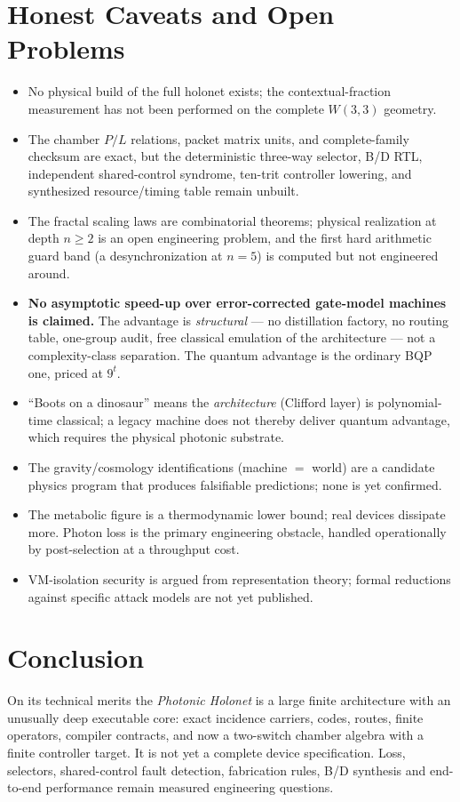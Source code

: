 \documentclass[11pt]{article}
\begin{document}
\section{Honest Caveats and Open Problems}
\label{sec:caveats}
\begin{itemize}[leftmargin=1.4em]
\item No physical build of the full holonet exists; the contextual-fraction measurement has not been
performed on the complete $W(3,3)$ geometry.
\item The chamber $P/L$ relations, packet matrix units, and complete-family checksum are exact, but
the deterministic three-way selector, B/D RTL, independent shared-control syndrome, ten-trit
controller lowering, and synthesized resource/timing table remain unbuilt.
\item The fractal scaling laws are combinatorial theorems; physical realization at depth $n\ge 2$ is an
open engineering problem, and the first hard arithmetic guard band (a desynchronization at $n=5$) is
computed but not engineered around.
\item \textbf{No asymptotic speed-up over error-corrected gate-model machines is claimed.} The advantage
is \emph{structural} --- no distillation factory, no routing table, one-group audit, free classical
emulation of the architecture --- not a complexity-class separation. The quantum advantage is the
ordinary BQP one, priced at $9^t$.
\item ``Boots on a dinosaur'' means the \emph{architecture} (Clifford layer) is polynomial-time
classical; a legacy machine does not thereby deliver quantum advantage, which requires the physical
photonic substrate.
\item The gravity/cosmology identifications (machine $=$ world) are a candidate physics program that
produces falsifiable predictions; none is yet confirmed.
\item The metabolic figure is a thermodynamic lower bound; real devices dissipate more. Photon loss is
the primary engineering obstacle, handled operationally by post-selection at a throughput cost.
\item VM-isolation security is argued from representation theory; formal reductions against specific
attack models are not yet published.
\end{itemize}

\section{Conclusion}
On its technical merits the \emph{Photonic Holonet} is a large finite architecture with an unusually
deep executable core: exact incidence carriers, codes, routes, finite operators, compiler contracts,
and now a two-switch chamber algebra with a finite controller target. It is not yet a complete device specification. Loss, selectors,
shared-control fault detection, fabrication rules, B/D synthesis and end-to-end performance remain
measured engineering questions.
\end{document}

